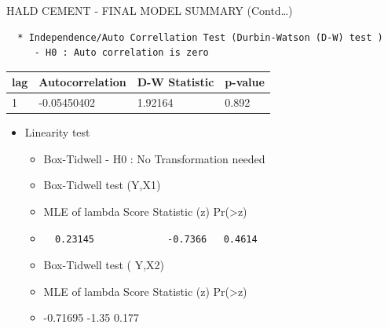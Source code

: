 \documentclass[
  ignorenonframetext,
]{beamer}
\providecommand{\tightlist}{%
  \setlength{\itemsep}{0pt}\setlength{\parskip}{0pt}}
\begin{document}
\begin{frame}[fragile]{HALD CEMENT - FINAL MODEL SUMMARY (Contd\ldots)}
\protect\hypertarget{hald-cement---final-model-summary-contd}{}
\begin{verbatim}
  * Independence/Auto Correllation Test (Durbin-Watson (D-W) test )
     - H0 : Auto correlation is zero
\end{verbatim}

\begin{longtable}[]{@{}llll@{}}
\toprule
lag & Autocorrelation & D-W Statistic & p-value \\
\midrule
\endhead
1 & -0.05450402 & 1.92164 & 0.892 \\
\bottomrule
\end{longtable}

\begin{itemize}
\tightlist
\item
  Linearity test

  \begin{itemize}
  \item
    Box-Tidwell - H0 : No Transformation needed
  \item
    Box-Tidwell test (Y,X1)
  \item
    MLE of lambda Score Statistic (z) Pr(\textgreater\textbar z\textbar)
  \item
\begin{verbatim}
  0.23145             -0.7366   0.4614
\end{verbatim}
  \item
    Box-Tidwell test ( Y,X2)
  \item
    MLE of lambda Score Statistic (z) Pr(\textgreater\textbar z\textbar)
  \item
    -0.71695 -1.35 0.177
  \end{itemize}
\end{itemize}
\end{frame}
\end{document}

